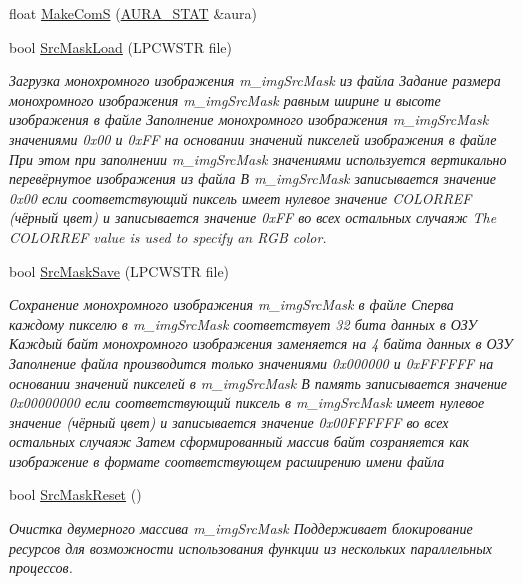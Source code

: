 \begin{DoxyCompactItemize}
float \hyperlink{class_c_v_i_engine_base_a6eaa6b468b27249a359a67ce1ce32c4f}{Make\+Com\+S} (\hyperlink{class_a_u_r_a___s_t_a_t}{A\+U\+R\+A\+\_\+\+S\+T\+A\+T} \&aura)
\item 
bool \hyperlink{class_c_v_i_engine_base_a2575b5618d3f87d4b10bb1f7294a3bad}{Src\+Mask\+Load} (L\+P\+C\+W\+S\+T\+R file)
\begin{DoxyCompactList}\small\item\em Загрузка монохромного изображения m\+\_\+img\+Src\+Mask из файла Задание размера монохромного изображения m\+\_\+img\+Src\+Mask равным ширине и высоте изображения в файле Заполнение монохромного изображения m\+\_\+img\+Src\+Mask значениями 0x00 и 0x\+F\+F на основании значений пикселей изображения в файле При этом при заполнении m\+\_\+img\+Src\+Mask значениями используется вертикально перевёрнутое изображения из файла В m\+\_\+img\+Src\+Mask записывается значение 0x00 если соответствующий пиксель имеет нулевое значение C\+O\+L\+O\+R\+R\+E\+F (чёрный цвет) и записывается значение 0x\+F\+F во всех остальных случаяж The C\+O\+L\+O\+R\+R\+E\+F value is used to specify an R\+G\+B color. \end{DoxyCompactList}\item 
bool \hyperlink{class_c_v_i_engine_base_a1d96cf239567fda73e26950353c69159}{Src\+Mask\+Save} (L\+P\+C\+W\+S\+T\+R file)
\begin{DoxyCompactList}\small\item\em Сохранение монохромного изображения m\+\_\+img\+Src\+Mask в файле Сперва каждому пикселю в m\+\_\+img\+Src\+Mask соответствует 32 бита данных в ОЗУ Каждый байт монохромного изображения заменяется на 4 байта данных в ОЗУ Заполнение файла производится только значениями 0x000000 и 0x\+F\+F\+F\+F\+F\+F на основании значений пикселей в m\+\_\+img\+Src\+Mask В память записывается значение 0x00000000 если соответствующий пиксель в m\+\_\+img\+Src\+Mask имеет нулевое значение (чёрный цвет) и записывается значение 0x00\+F\+F\+F\+F\+F\+F во всех остальных случаяж Затем сформированный массив байт созраняется как изображение в формате соответствующем расширению имени файла \end{DoxyCompactList}\item 
bool \hyperlink{class_c_v_i_engine_base_ac394163149bb674cf127f16392f41047}{Src\+Mask\+Reset} ()
\begin{DoxyCompactList}\small\item\em Очистка двумерного массива m\+\_\+img\+Src\+Mask Поддерживает блокирование ресурсов для возможности использования функции из нескольких параллельных процессов. \end{DoxyCompactList}\item 

\end{DoxyCompactItemize}
